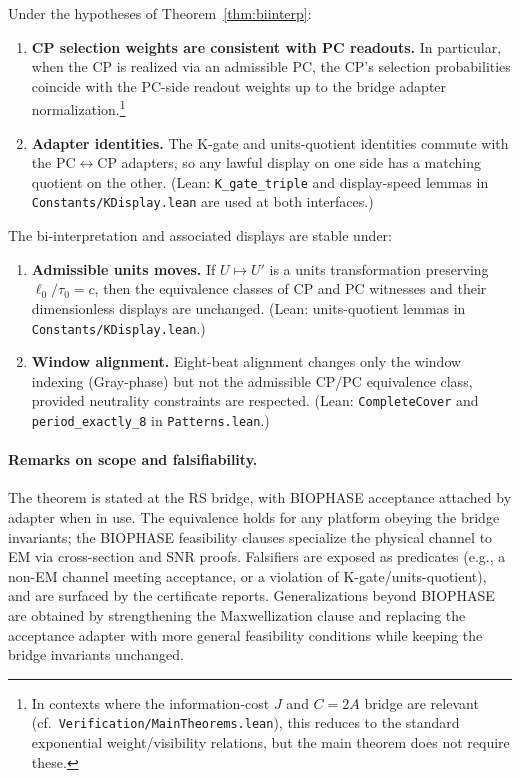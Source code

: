 \documentclass[12pt,a4paper]{article}
\begin{document}
\begin{corollary}
\label{cor:weights-readout}
Under the hypotheses of Theorem~\ref{thm:biinterp}:
\begin{enumerate}
  \item \textbf{CP selection weights are consistent with PC readouts.} In particular, when the CP is realized via an admissible PC, the CP's selection probabilities coincide with the PC-side readout weights up to the bridge adapter normalization.\footnote{In contexts where the information-cost \(J\) and \(C{=}2A\) bridge are relevant (cf.\ \texttt{Verification/MainTheorems.lean}), this reduces to the standard exponential weight/visibility relations, but the main theorem does not require these.}
  \item \textbf{Adapter identities.} The K-gate and units-quotient identities commute with the PC\(\leftrightarrow\)CP adapters, so any lawful display on one side has a matching quotient on the other. (Lean: \texttt{K\_gate\_triple} and display-speed lemmas in \texttt{Constants/KDisplay.lean} are used at both interfaces.)
\end{enumerate}
\end{corollary}

\begin{corollary}
\label{cor:stability}
The bi-interpretation and associated displays are stable under:
\begin{enumerate}
  \item \textbf{Admissible units moves.} If \(U\mapsto U'\) is a units transformation preserving \(\ell_0/\tau_0=c\), then the equivalence classes of CP and PC witnesses and their dimensionless displays are unchanged. (Lean: units-quotient lemmas in \texttt{Constants/KDisplay.lean}.)
  \item \textbf{Window alignment.} Eight-beat alignment changes only the window indexing (Gray-phase) but not the admissible CP/PC equivalence class, provided neutrality constraints are respected. (Lean: \texttt{CompleteCover} and \texttt{period\_exactly\_8} in \texttt{Patterns.lean}.)
\end{enumerate}
\end{corollary}

\paragraph{Remarks on scope and falsifiability.}
The theorem is stated at the RS bridge, with BIOPHASE acceptance attached by adapter when in use. The equivalence holds for any platform obeying the bridge invariants; the BIOPHASE feasibility clauses specialize the physical channel to EM via cross-section and SNR proofs. Falsifiers are exposed as predicates (e.g., a non-EM channel meeting acceptance, or a violation of K-gate/units-quotient), and are surfaced by the certificate reports. Generalizations beyond BIOPHASE are obtained by strengthening the Maxwellization clause and replacing the acceptance adapter with more general feasibility conditions while keeping the bridge invariants unchanged.
\end{document}
